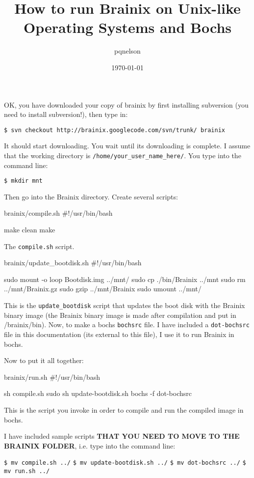 \documentclass{article}
\title{How to run Brainix on Unix-like Operating Systems and Bochs}
\author{pqnelson}
\date{\today}
\begin{document}
 \maketitle

OK, you have downloaded your copy of brainix by first installing subversion (you need to install subversion!), then type in:

\verb|$ svn checkout http://brainix.googlecode.com/svn/trunk/ brainix|

It should start downloading. You wait until its downloading is complete. I assume that the working directory is \verb|/home/your_user_name_here/|. You type into the command line:

\verb|$ mkdir mnt|

Then go into the Brainix directory. Create several scripts:
\begin{code}{brainix/compile.sh}
#!/usr/bin/bash

make clean
make
\end{code}
The \verb|compile.sh| script.
\begin{code}{brainix/update\_bootdisk.sh}
#!/usr/bin/bash

sudo mount -o loop Bootdisk.img ../mnt/
sudo cp ./bin/Brainix ../mnt
sudo rm ../mnt/Brainix.gz
sudo gzip ../mnt/Brainix
sudo umount ../mnt/
\end{code}
This is the \verb|update_bootdisk| script that updates the boot disk with the Brainix binary image (the Brainix binary image is made after compilation and put in /brainix/bin). Now, to make a bochs \verb|bochsrc| file. I have included a \verb|dot-bochsrc| file in this documentation (its external to this file), I use it to run Brainix in bochs.

Now to put it all together:
\begin{code}{brainix/run.sh}
#!/usr/bin/bash

sh compile.sh
sudo sh update-bootdisk.sh
bochs -f dot-bochsrc
\end{code}
This is the script you invoke in order to compile and run the compiled image in bochs.

I have included sample scripts \textbf{THAT YOU NEED TO MOVE TO THE BRAINIX FOLDER}, i.e. type into the command line:

\verb|$ mv compile.sh ../|
\verb|$ mv update-bootdisk.sh ../|
\verb|$ mv dot-bochsrc ../|
\verb|$ mv run.sh ../|
\end{document}
